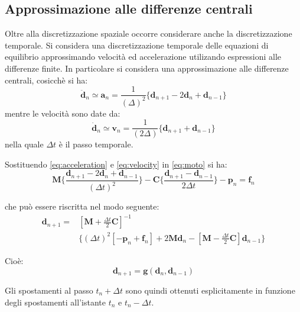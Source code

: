 \subsection{Approssimazione alle differenze centrali}
Oltre alla discretizzazione spaziale occorre considerare anche la discretizzazione temporale. Si considera una discretizzazione temporale delle equazioni di equilibrio approssimando velocità ed accelerazione utilizando espressioni alle differenze finite. In particolare si considera una approssimazione alle differenze centrali, cosicchè si ha:
\begin{equation}
	\boldsymbol{\ddot{d}}_n \simeq \boldsymbol{a}_n = \frac{1}{(\varDelta)^2} \{\boldsymbol{d}_{n+1} -2 \boldsymbol{d}_n + \boldsymbol{d}_{n-1}\}
	\label{eq:acceleration}
\end{equation}
mentre le velocità sono date da:
\begin{equation}
	\boldsymbol{\dot{d}}_n \simeq \boldsymbol{v}_n = \frac{1}{(2\varDelta)} \{\boldsymbol{d}_{n+1} + \boldsymbol{d}_{n-1}\}
	\label{eq:velocity}
\end{equation}
nella quale $\Delta t$ è il passo temporale. 

Sostituendo \ref{eq:acceleration} e \ref{eq:velocity} in \ref{eq:moto} si ha:
\begin{equation}
	\boldsymbol{M} \{ \frac{\boldsymbol{d}_{n+1} -2 \boldsymbol{d}_n + \boldsymbol{d}_{n-1}} {(\Delta t)^2} \} -
	\boldsymbol{C} \{ \frac{\boldsymbol{d}_{n+1} - \boldsymbol{d}_{n-1}}{2 \varDelta t} \} - \boldsymbol{p}_n = \boldsymbol{f}_n
\end{equation}

che può essere riscritta nel modo seguente:
\begin{equation}
	\begin{split}
	\boldsymbol{d}_{n+1} = & [\boldsymbol{M} + \frac{\varDelta t}{2} \boldsymbol{C}]^{-1} \\
	                       & \{ (\varDelta t)^2 [- \boldsymbol{p}_n + \boldsymbol{f}_n ] +
	2 \boldsymbol{M} \boldsymbol{d}_n - [\boldsymbol{M} - \frac{\varDelta t}{2} \boldsymbol{C}] \boldsymbol{d}_{n-1} \}
	\end{split}
\end{equation}

Cioè:
\begin{equation}
	\boldsymbol{d}_{n+1} = \boldsymbol{g}(\boldsymbol{d}_{n}, \boldsymbol{d}_{n-1})
	\label{eq:displacement}
\end{equation}

Gli spostamenti al passo $t_n + \varDelta t$ sono quindi ottenuti esplicitamente in funzione degli spostamenti all'istante $t_n$ e $t_n - \varDelta t$.

